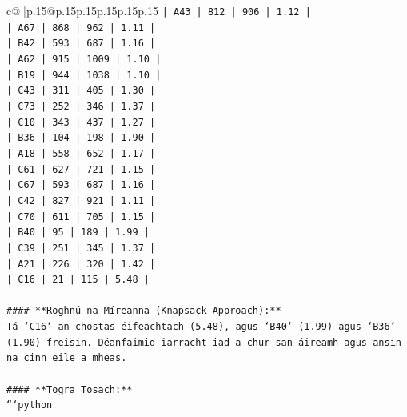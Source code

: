 \documentclass{article}
\begin{document}
{\begin{supertabular}{c@{$\;$}|p{.15\linewidth}@{}p{.15\linewidth}p{.15\linewidth}p{.15\linewidth}p{.15\linewidth}p{.15\linewidth}}
{{{\texttt{| A43  | 812      | 906      | 1.12                          |} \\
\texttt{| A67  | 868      | 962      | 1.11                          |} \\
\texttt{| B42  | 593      | 687      | 1.16                          |} \\
\texttt{| A62  | 915      | 1009     | 1.10                          |} \\
\texttt{| B19  | 944      | 1038     | 1.10                          |} \\
\texttt{| C43  | 311      | 405      | 1.30                          |} \\
\texttt{| C73  | 252      | 346      | 1.37                          |} \\
\texttt{| C10  | 343      | 437      | 1.27                          |} \\
\texttt{| B36  | 104      | 198      | 1.90                          |} \\
\texttt{| A18  | 558      | 652      | 1.17                          |} \\
\texttt{| C61  | 627      | 721      | 1.15                          |} \\
\texttt{| C67  | 593      | 687      | 1.16                          |} \\
\texttt{| C42  | 827      | 921      | 1.11                          |} \\
\texttt{| C70  | 611      | 705      | 1.15                          |} \\
\texttt{| B40  | 95       | 189      | 1.99                          |} \\
\texttt{| C39  | 251      | 345      | 1.37                          |} \\
\texttt{| A21  | 226      | 320      | 1.42                          |} \\
\texttt{| C16  | 21       | 115      | 5.48                          |} \\
\\ 
\texttt{\#\#\#\# **Roghnú na Míreanna (Knapsack Approach):**} \\
\texttt{Tá `C16` an{-}chostas{-}éifeachtach (5.48), agus `B40` (1.99) agus `B36` (1.90) freisin. Déanfaimid iarracht iad a chur san áireamh agus ansin na cinn eile a mheas.} \\
\\ 
\texttt{\#\#\#\# **Togra Tosach:**} \\
\texttt{```python} \\
}}}
\end{supertabular}}
\end{document}
